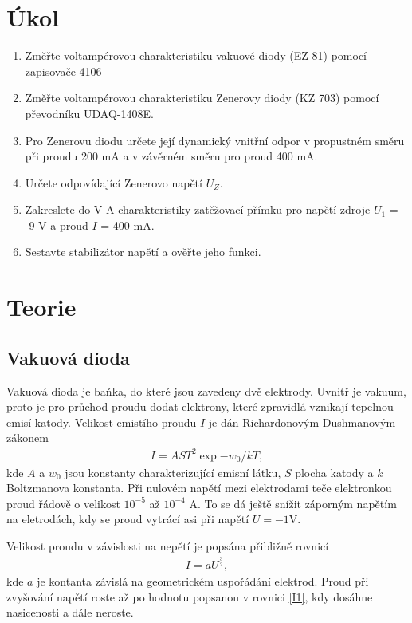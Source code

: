 \documentclass[a4paper,12pt]{article}
\begin{document}
\section{Úkol}
\noindent
\begin{enumerate}
    \item Změřte voltampérovou charakteristiku vakuové diody (EZ 81) pomocí zapisovače 4106
    \item Změřte voltampérovou charakteristiku Zenerovy diody (KZ 703) pomocí převodníku UDAQ-1408E.
    \item Pro Zenerovu diodu určete její dynamický vnitřní odpor v propustném směru při proudu 200 mA a v závěrném směru pro proud 400 mA.
    \item Určete odpovídající Zenerovo napětí $U_Z$.
    \item Zakreslete do V-A charakteristiky zatěžovací přímku pro napětí zdroje $U_1$ = -9 V a proud $I$ = 400 mA.
    \item Sestavte stabilizátor napětí a ověřte jeho funkci.
\end{enumerate}


\section{Teorie}
\subsection{Vakuová dioda}
Vakuová dioda je baňka, do které jsou zavedeny dvě elektrody. Uvnitř je vakuum, proto je pro průchod proudu dodat elektrony, které zpravidlá 
vznikají tepelnou emisí katody. Velikost emistího proudu $I$ je dán Richardonovým-Dushmanovým zákonem
\begin{eqnarray}
I=AST^2\exp{-w_0/kT},
\label{I1}
\end{eqnarray}
kde $A$ a $w_0$ jsou konstanty charakterizující emisní látku, $S$ plocha katody a $k$ Boltzmanova konstanta. Při nulovém napětí mezi elektrodami 
teče elektronkou proud řádově o velikost $10^{-5}$ až $10^{-4}$ A. To se dá ještě snížit záporným napětím na eletrodách, kdy se proud vytrácí asi 
při napětí $U=-1$V.

Velikost proudu v závislosti na nepětí je popsána přibližně rovnicí
\begin{eqnarray}
I=aU^{\frac{3}{2}},
\end{eqnarray}
kde $a$ je kontanta závislá na geometrickém uspořádání elektrod. Proud při zvyšování napětí roste až po hodnotu popsanou v rovnici \ref{I1}, kdy dosáhne 
nasicenosti a dále neroste.
\end{document}
